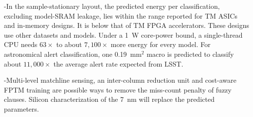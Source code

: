 \hyp{In the sample-stationary layout, the predicted \gainp{} energy per classification, excluding model-SRAM leakage, lies within the range reported for TM ASICs and in-memory designs. It is below that of TM FPGA accelerators. These designs use other datasets and models. Under a 1~W core-power bound, a single-thread CPU needs $63\times$ to about $7{,}100\times$ more energy for every model. For astronomical alert classification, one 0.19~mm$^2$ macro is predicted to classify about $11{,}000\times$ the average alert rate expected from LSST.}

\hyp{Multi-level matchline sensing, an inter-column reduction unit and cost-aware FPTM training are possible ways to remove the miss-count penalty of fuzzy clauses. Silicon characterization of the 7~nm \gainp{} will replace the predicted parameters.}
